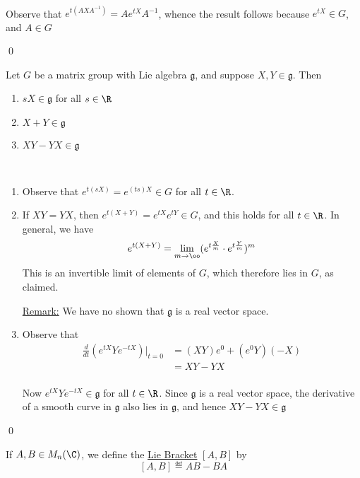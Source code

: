 \documentclass[x11names,reqno,14pt]{extarticle}
\newcommand{\mk}[1]{\mathfrak{#1}}
\newcommand{\dd}[2]{\frac{d#1}{d#2}}
\begin{document}
\proof
\,

Observe that $e^{t(AXA^{-1})} = Ae^{tX}A^{-1}$, whence the result follows because $e^{tX} \in G$, and $A \in G$

\qed

\prop

Let $G$ be a matrix group with Lie algebra $\mk{g}$, and suppose $X, Y \in \mk{g}$. Then 
\begin{enumerate}

\item $sX \in \mk{g}$ for all $s \in \R$

\item $X + Y \in \mk{g}$

\item $XY - YX \in \mk{g}$

\end{enumerate}

\proof

\,
\begin{enumerate}

\item Observe that $e^{t(sX)} = e^{(ts)X} \in G$ for all $t \in \R$.

\item If $XY = YX$, then $e^{t(X + Y)} = e^{tX}e^{tY} \in G$, and this holds for all $t \in \R$. In general, we have
\[
e^{t(X + Y)} = \lim_{m\to\oo}(e^{t\frac{X}{m}}\cdot e^{t\frac{Y}{m}})^m
\]
This is an invertible limit of elements of $G$, which therefore lies in $G$, as claimed. 

\underline{Remark:} We have no shown that $\mk{g}$ is a real vector space. 

\item Observe that
\begin{align*}
\dd{}{t}(e^{tX}Ye^{-tX})|_{t=0} & = (XY)e^0 + (e^0Y)(-X) \\
										  & = XY - YX \\
\end{align*}

Now $e^{tX}Ye^{-tX} \in \mk{g}$ for all $t\in\R$. Since $\mk{g}$ is a real vector space, the derivative of a smooth curve in $\mk{g}$ also lies in $\mk{g}$, and hence $XY - YX \in \mk{g}$

\end{enumerate}

\qed


If $A, B \in M_n(\C)$, we define the \underline{Lie Bracket} $[A,B]$ by 
\[
[A,B]\eqdef AB - BA
\]
\end{document}
